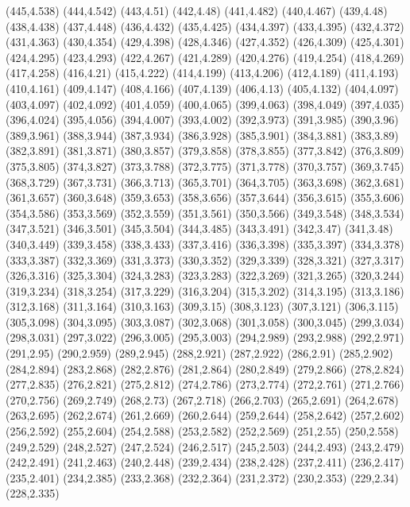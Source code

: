 (445,4.538)
(444,4.542)
(443,4.51)
(442,4.48)
(441,4.482)
(440,4.467)
(439,4.48)
(438,4.438)
(437,4.448)
(436,4.432)
(435,4.425)
(434,4.397)
(433,4.395)
(432,4.372)
(431,4.363)
(430,4.354)
(429,4.398)
(428,4.346)
(427,4.352)
(426,4.309)
(425,4.301)
(424,4.295)
(423,4.293)
(422,4.267)
(421,4.289)
(420,4.276)
(419,4.254)
(418,4.269)
(417,4.258)
(416,4.21)
(415,4.222)
(414,4.199)
(413,4.206)
(412,4.189)
(411,4.193)
(410,4.161)
(409,4.147)
(408,4.166)
(407,4.139)
(406,4.13)
(405,4.132)
(404,4.097)
(403,4.097)
(402,4.092)
(401,4.059)
(400,4.065)
(399,4.063)
(398,4.049)
(397,4.035)
(396,4.024)
(395,4.056)
(394,4.007)
(393,4.002)
(392,3.973)
(391,3.985)
(390,3.96)
(389,3.961)
(388,3.944)
(387,3.934)
(386,3.928)
(385,3.901)
(384,3.881)
(383,3.89)
(382,3.891)
(381,3.871)
(380,3.857)
(379,3.858)
(378,3.855)
(377,3.842)
(376,3.809)
(375,3.805)
(374,3.827)
(373,3.788)
(372,3.775)
(371,3.778)
(370,3.757)
(369,3.745)
(368,3.729)
(367,3.731)
(366,3.713)
(365,3.701)
(364,3.705)
(363,3.698)
(362,3.681)
(361,3.657)
(360,3.648)
(359,3.653)
(358,3.656)
(357,3.644)
(356,3.615)
(355,3.606)
(354,3.586)
(353,3.569)
(352,3.559)
(351,3.561)
(350,3.566)
(349,3.548)
(348,3.534)
(347,3.521)
(346,3.501)
(345,3.504)
(344,3.485)
(343,3.491)
(342,3.47)
(341,3.48)
(340,3.449)
(339,3.458)
(338,3.433)
(337,3.416)
(336,3.398)
(335,3.397)
(334,3.378)
(333,3.387)
(332,3.369)
(331,3.373)
(330,3.352)
(329,3.339)
(328,3.321)
(327,3.317)
(326,3.316)
(325,3.304)
(324,3.283)
(323,3.283)
(322,3.269)
(321,3.265)
(320,3.244)
(319,3.234)
(318,3.254)
(317,3.229)
(316,3.204)
(315,3.202)
(314,3.195)
(313,3.186)
(312,3.168)
(311,3.164)
(310,3.163)
(309,3.15)
(308,3.123)
(307,3.121)
(306,3.115)
(305,3.098)
(304,3.095)
(303,3.087)
(302,3.068)
(301,3.058)
(300,3.045)
(299,3.034)
(298,3.031)
(297,3.022)
(296,3.005)
(295,3.003)
(294,2.989)
(293,2.988)
(292,2.971)
(291,2.95)
(290,2.959)
(289,2.945)
(288,2.921)
(287,2.922)
(286,2.91)
(285,2.902)
(284,2.894)
(283,2.868)
(282,2.876)
(281,2.864)
(280,2.849)
(279,2.866)
(278,2.824)
(277,2.835)
(276,2.821)
(275,2.812)
(274,2.786)
(273,2.774)
(272,2.761)
(271,2.766)
(270,2.756)
(269,2.749)
(268,2.73)
(267,2.718)
(266,2.703)
(265,2.691)
(264,2.678)
(263,2.695)
(262,2.674)
(261,2.669)
(260,2.644)
(259,2.644)
(258,2.642)
(257,2.602)
(256,2.592)
(255,2.604)
(254,2.588)
(253,2.582)
(252,2.569)
(251,2.55)
(250,2.558)
(249,2.529)
(248,2.527)
(247,2.524)
(246,2.517)
(245,2.503)
(244,2.493)
(243,2.479)
(242,2.491)
(241,2.463)
(240,2.448)
(239,2.434)
(238,2.428)
(237,2.411)
(236,2.417)
(235,2.401)
(234,2.385)
(233,2.368)
(232,2.364)
(231,2.372)
(230,2.353)
(229,2.34)
(228,2.335)
